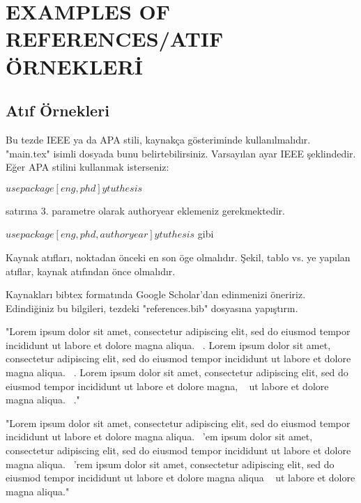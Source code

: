 \chapter{EXAMPLES OF REFERENCES/ATIF ÖRNEKLERİ}

\section{Atıf Örnekleri}
Bu tezde IEEE ya da APA stili, kaynakça gösteriminde kullanılmalıdır. "main.tex" isimli dosyada bunu belirtebilirsiniz. Varsayılan ayar IEEE şeklindedir. Eğer APA stilini kullanmak isterseniz:

$usepackage[eng, phd]{ytuthesis}$

satırına 3. parametre olarak authoryear eklemeniz gerekmektedir.

$usepackage[eng, phd, authoryear]{ytuthesis}$ gibi

Kaynak atıfları, noktadan önceki en son öge olmalıdır. Şekil, tablo vs. ye yapılan atıflar, kaynak atıfından önce olmalıdır.

Kaynakları bibtex formatında Google Scholar'dan edinmenizi öneririz. Edindiğiniz bu bilgileri, tezdeki "references.bib" dosyasına yapıştırın.


\if@ieeetrue

"Lorem ipsum dolor sit amet, consectetur adipiscing elit, sed do eiusmod tempor incididunt ut labore et dolore magna aliqua.  ~\cite{biopsy}. Lorem ipsum dolor sit amet, consectetur adipiscing elit, sed do eiusmod tempor incididunt ut labore et dolore magna aliqua.  ~\cite{mohan2018textbook}. Lorem ipsum dolor sit amet, consectetur adipiscing elit, sed do eiusmod tempor incididunt ut labore et dolore magna, ~\cite{van2007experimental} ut labore et dolore magna aliqua.  ~\cite{xing2016robust}."

\else
"Lorem ipsum dolor sit amet, consectetur adipiscing elit, sed do eiusmod tempor incididunt ut labore et dolore magna aliqua.  ~\parencite{biopsy}'em ipsum dolor sit amet, consectetur adipiscing elit, sed do eiusmod tempor incididunt ut labore et dolore magna aliqua. ~\parencite{mohan2018textbook}'rem ipsum dolor sit amet, consectetur adipiscing elit, sed do eiusmod tempor incididunt ut labore et dolore magna aliqua ~\parencite{van2007experimental, xing2016robust} ut labore et dolore magna aliqua." 
\fi

